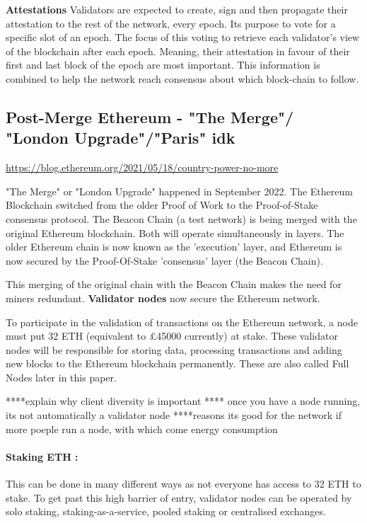 \textbf{Attestations}
Validators are expected to create, sign and then propagate their attestation to the rest of the network, every epoch.
Its purpose to vote for a specific slot of an epoch. The focus of this voting to retrieve each validator's view of the blockchain after each epoch. Meaning, their attestation in favour of their first and last block of the epoch are most important. This information is combined to help the network reach consensus about which block-chain to follow.



\subsection{Post-Merge Ethereum - "The Merge"/ "London Upgrade"/"Paris" idk}

\url{https://blog.ethereum.org/2021/05/18/country-power-no-more}

"The Merge" or "London Upgrade" happened in September 2022. The Ethereum Blockchain switched from the older Proof of Work to the Proof-of-Stake consensus protocol. The Beacon Chain (a test network) is being merged with the original Ethereum blockchain. Both will operate simultaneously in layers. The older Ethereum chain is now known as the 'execution' layer, and Ethereum is now secured by the Proof-Of-Stake 'consensus' layer (the Beacon Chain). 

This merging of the original chain with the Beacon Chain makes the need for miners redundant. \textbf{Validator nodes} now secure the Ethereum network. 

To participate in the validation of transactions on the Ethereum network, a node must put 32 ETH (equivalent to £45000 currently) at stake. These validator nodes will be responsible for storing data, processing transactions and adding new blocks to the Ethereum blockchain permanently. These are also called Full Nodes later in this paper.


 ****explain why client diversity is important
 **** once you have a node running, its not automatically a validator node
****reasons its good for the network if more poeple run a node, with which come energy consumption
 
\paragraph{Staking ETH :}
This can be done in many different ways as not everyone has access to 32 ETH to stake. To get past this high barrier of entry, validator nodes can be operated by solo staking, staking-as-a-service, pooled staking or centralised exchanges.

